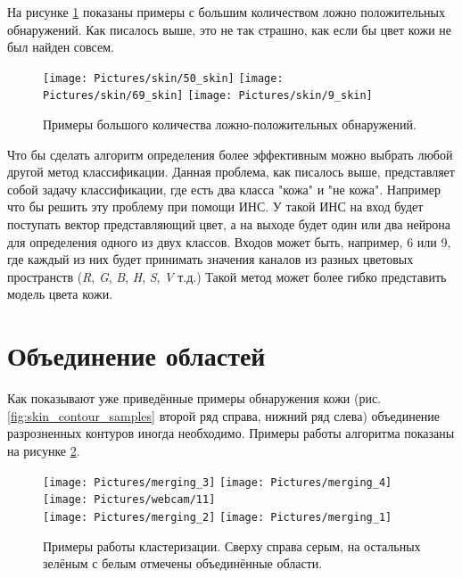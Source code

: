 \documentclass[12pt]{report}
\begin{document}
На рисунке \ref{fig:many_false_possitives} показаны примеры с большим количеством ложно положительных обнаружений. 
Как писалось выше, это не так страшно, как если бы цвет кожи не был найден совсем.
\begin{figure}[h]
	\centering	
	\texttt{[image: Pictures/skin/50\_skin]}\hspace{0.2cm}
	\texttt{[image: Pictures/skin/69\_skin]}\hspace{0.2cm}
	\texttt{[image: Pictures/skin/9\_skin]}\hspace{0.2cm}
		
	\caption{Примеры большого количества ложно-положительных обнаружений.}	
	\label{fig:many_false_possitives}
\end{figure}

Что бы сделать алгоритм определения более эффективным можно выбрать любой другой метод классификации. Данная 
проблема, как писалось выше, представляет собой задачу классификации, где есть два класса "кожа" и "не кожа". 
Например что бы решить эту проблему при помощи ИНС. У такой ИНС на вход будет поступать вектор представляющий цвет, 
а 
на выходе будет один или два нейрона для определения одного из двух классов. Входов может быть, например, 6 или 9, 
где каждый из них будет принимать значения каналов из разных цветовых пространств (\textit{R}, \textit{G}, \textit
{B}, \textit{H}, \textit{S}, \textit{V} т.д.) Такой метод может более гибко представить модель цвета кожи.

\section{Объединение областей}
Как показывают уже приведённые примеры обнаружения кожи (рис. \ref{fig:skin_contour_samples} второй ряд справа, 
нижний ряд слева) объединение разрозненных контуров иногда необходимо. Примеры работы алгоритма показаны на рисунке 
\ref{fig:merging_examples}.

\begin{figure}[h]
	\centering	
	\texttt{[image: Pictures/merging\_3]}\hspace{0.2cm}
	\texttt{[image: Pictures/merging\_4]}\hspace{0.2cm}
	\texttt{[image: Pictures/webcam/11]}\hspace{0.2cm}
	\\[0.5cm]
	\texttt{[image: Pictures/merging\_2]}\hspace{0.2cm}
	\texttt{[image: Pictures/merging\_1]}\hspace{0.2cm}
	
	\caption{Примеры работы кластеризации. Сверху справа серым, на остальных зелёным с белым отмечены объединённые 
области.}
	\label{fig:merging_examples}
\end{figure}
\end{document}
